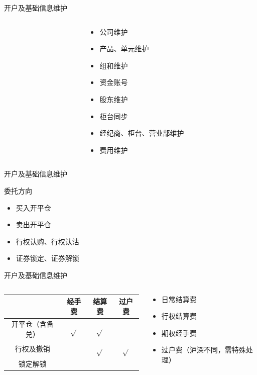 \documentclass[12pt]{ctexbeamer}	%
\begin{document}
\begin{frame}{开户及基础信息维护}
  \begin{columns}
    \begin{column}{0.60\textwidth}
    \end{column}
    \begin{column}{0.40\textwidth}
      \begin{itemize}
        \item 公司维护
        \item 产品、单元维护
        \item 组和维护
        \item 资金账号
        \item 股东维护
        \item 柜台同步
        \item 经纪商、柜台、营业部维护
        \item 费用维护
      \end{itemize}
    \end{column}
  \end{columns}
\end{frame}

\begin{frame}{开户及基础信息维护}
  \begin{block}{委托方向}
    \begin{itemize}
      \item 买入开平仓
      \item 卖出开平仓
      \item 行权认购、行权认沽
      \item 证券锁定、证券解锁
    \end{itemize}
  \end{block}
\end{frame}

\begin{frame}{开户及基础信息维护}
  \begin{columns}
    \begin{column}{0.70\textwidth}
      \begin{tabular}{ c | c | c | c }
         & 经手费 & 结算费 & 过户费 \\
        \hline
        开平仓（含备兑） & $\sqrt{}$ & $\sqrt{}$ &  \\
        \hline
        行权及撤销 &  & $\sqrt{}$ & $\sqrt{}$ \\
        \hline
        锁定解锁 & & & \\
      \end{tabular}
    \end{column}
    \begin{column}{0.30\textwidth}
      \begin{itemize}
        \item 日常结算费
        \item 行权结算费
        \item 期权经手费
        \item 过户费（沪深不同，需特殊处理）
      \end{itemize}
    \end{column}
  \end{columns}
\end{frame}
\end{document}
